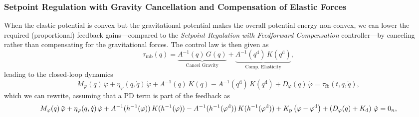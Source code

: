 

\subsubsection{Setpoint Regulation with Gravity Cancellation and Compensation of Elastic Forces}
When the elastic potential is convex but the gravitational potential makes the overall potential energy non-convex, we can lower the required (proportional) feedback gains—compared to the \emph{Setpoint Regulation with Feedforward Compensation} controller—by canceling rather than compensating for the gravitational forces.
The control law is then given as~\citep{della2020model}
\begin{equation}
    \tau_\mathrm{mb}(q) =  \underbrace{A^{-1}(q) \, G(q)}_\text{Cancel Gravity} + \underbrace{A^{-1}(q^\mathrm{d}) \, K(q^\mathrm{d})}_\text{Comp. Elasticity},
\end{equation}
leading to the closed-loop dynamics
\begin{equation}
    M_\varphi(q) \, \ddot{\varphi} + \eta_\varphi(q,\dot{q}) \, \dot{\varphi} + A^{-1}(q) \,  K(q) - A^{-1}(q^\mathrm{d}) \, K(q^\mathrm{d}) + D_\varphi(q) \, \dot{\varphi} = \tau_\mathrm{fb}(t, q, \dot{q}),
\end{equation}
which we can rewrite, assuming that a PD term is part of the feedback as
\begin{equation}\footnotesize
    M_\varphi(q) \, \ddot{\varphi} + \eta_\varphi(q,\dot{q}) \, \dot{\varphi} + A^{-1}(h^{-1}(\varphi)) \,  K(h^{-1}(\varphi)) - A^{-1}(h^{-1}(\varphi^\mathrm{d})) \, K(h^{-1}(\varphi^\mathrm{d})) + K_\mathrm{p} \left ( \varphi-\varphi^\mathrm{d} \right ) + \left ( D_\varphi(q) + K_\mathrm{d} \right ) \, \dot{\varphi} = 0_n,
\end{equation}
